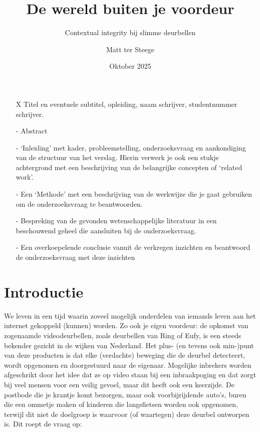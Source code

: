 \documentclass[nonacm,sigconf]{acmart}
\title{De wereld buiten je voordeur}
\subtitle{Contextual integrity bij slimme deurbellen}
\author{Matt ter Steege}
\date{Oktober 2025} %
\affiliation{
    \institution{Universiteit Utrecht, 9932003}
    \city{Utrecht}
    \country{Nederland}
}
\begin{document}
    \maketitle

    \begin{editorsonlyBox}
    \begin{itemize}[leftmargin = *,listparindent =1cm]
        \item[X] Titel en eventuele subtitel, opleiding, naam schrijver, studentnummer schrijver.
        \item[-] Abstract
        \item[-] ‘Inleiding’ met kader, probleemstelling, onderzoeksvraag en aankondiging van de structuur van het verslag. Hierin verwerk je ook een stukje achtergrond met een beschrijving van de belangrijke concepten of ‘related work’.
        \item[-] Een ‘Methode’ met een beschrijving van de werkwijze die je gaat gebruiken om de onderzoeksvraag te beantwoorden.
        \item[-] Bespreking van de gevonden wetenschappelijke literatuur in een beschouwend geheel die aansluiten bij de onderzoeksvraag.
        \item[-] Een overkoepelende conclusie vanuit de verkregen inzichten en beantwoord de onderzoeksvraag met deze inzichten
    \end{itemize}
    \end{editorsonlyBox}

    \section{Introductie}
    We leven in een tijd waarin zoveel mogelijk onderdelen van iemands leven aan het internet gekoppeld (kunnen) worden.
    Zo ook je eigen voordeur: de opkomst van zogenaamde videodeurbellen, zoals deurbellen van Ring of Eufy, is een steeds bekender gezicht in de wijken van Nederland.
    Het plus- (en tevens ook min-)punt van deze producten is dat elke (verdachte) beweging die de deurbel detecteert, wordt opgenomen en doorgestuurd naar de eigenaar.
    Mogelijke inbrekers worden afgeschrikt door het idee dat ze op video staan bij een inbraakpoging en dat zorgt bij veel mensen voor een veilig gevoel, maar dit heeft ook een keerzijde.
    De postbode die je krantje komt bezorgen, maar ook voorbijrijdende auto’s, buren die een ommetje maken of kinderen die langsfietsen worden ook opgenomen, terwijl dit niet de doelgroep is waarvoor (of waartegen) deze deurbel ontworpen is.
    Dit roept de vraag op:
\end{document}
